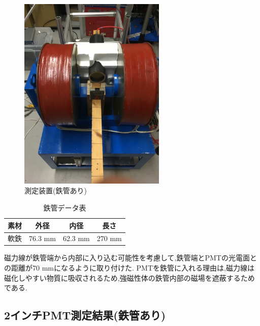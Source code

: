 \begin{figure}[h]
	\centering
		\includegraphics[width=7cm]{fig/iguchi/2inchinFe.jpg}
	\caption{測定装置(鉄管あり)}
	\label{2inchinFe}
\end{figure}


\begin{table}[h]
	\centering
	 \begin{tabular}{cccc} \hline
		素材 & 外径 & 内径 & 長さ \\ \hline \hline
		軟鉄 & 76.3 mm & 62.3 mm & 270 mm \\ \hline
	\end{tabular}
	  \caption{鉄管データ表}
	  \label{ironpipedata}
\end{table}

磁力線が鉄管端から内部に入り込む可能性を考慮して,鉄管端とPMTの光電面との距離が70 mmになるように取り付けた.
PMTを鉄管に入れる理由は,磁力線は磁化しやすい物質に吸収されるため,強磁性体の鉄管内部の磁場を遮蔽するためである.



\subsection{2インチPMT測定結果(鉄管あり)}

